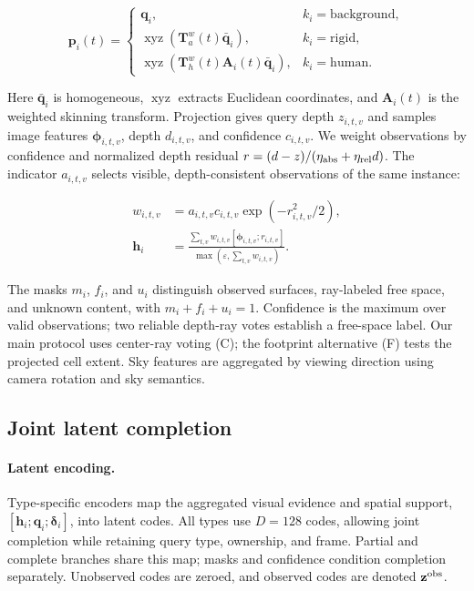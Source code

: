 \begin{equation}
\mathbf p_i(t)=
\begin{cases}
\mathbf q_i,& k_i=\mathrm{background},\\
\operatorname{xyz}(\mathbf T^w_a(t)\bar{\mathbf q}_i),& k_i=\mathrm{rigid},\\
\operatorname{xyz}(\mathbf T^w_h(t)\mathbf A_i(t)\bar{\mathbf q}_i),& k_i=\mathrm{human}.
\end{cases}
\label{eq:query-placement}
\end{equation}

Here $\bar{\mathbf q}_i$ is homogeneous, $\operatorname{xyz}$ extracts Euclidean coordinates, and $\mathbf A_i(t)$ is the weighted skinning transform. Projection gives query depth $z_{i,t,v}$ and samples image features $\boldsymbol\phi_{i,t,v}$, depth $d_{i,t,v}$, and confidence $c_{i,t,v}$. We weight observations by confidence and normalized depth residual $r=(d-z)/(\eta_{\rm abs}+\eta_{\rm rel}d)$. The indicator $a_{i,t,v}$ selects visible, depth-consistent observations of the same instance:

\begin{align}
w_{i,t,v}&=a_{i,t,v}c_{i,t,v}\exp(-r_{i,t,v}^2/2),\\
\mathbf h_i&=\frac{\sum_{t,v}w_{i,t,v}[\boldsymbol\phi_{i,t,v};r_{i,t,v}]}
{\max(\varepsilon,\sum_{t,v}w_{i,t,v})}.
\label{eq:aggregation}
\end{align}

The masks $m_i$, $f_i$, and $u_i$ distinguish observed surfaces, ray-labeled free space, and unknown content, with $m_i+f_i+u_i=1$. Confidence is the maximum over valid observations; two reliable depth-ray votes establish a free-space label. Our main protocol uses center-ray voting (C); the footprint alternative (F) tests the projected cell extent. Sky features are aggregated by viewing direction using camera rotation and sky semantics.

\subsection{Joint latent completion}
\label{sec:codec}
\label{sec:completion}

\paragraph{Latent encoding.}

Type-specific encoders map the aggregated visual evidence and spatial support, $[\mathbf h_i;\mathbf q_i;\boldsymbol\delta_i]$, into latent codes. All types use $D=128$ codes, allowing joint completion while retaining query type, ownership, and frame. Partial and complete branches share this map; masks and confidence condition completion separately. Unobserved codes are zeroed, and observed codes are denoted $\mathbf z^{\rm obs}$.

